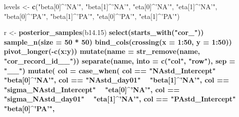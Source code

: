 \documentclass[]{article}
\newenvironment{Shaded}{\begin{snugshade}}{\end{snugshade}}
\newcommand{\DataTypeTok}[1]{\textcolor[rgb]{0.13,0.29,0.53}{#1}}
\newcommand{\DecValTok}[1]{\textcolor[rgb]{0.00,0.00,0.81}{#1}}
\newcommand{\FloatTok}[1]{\textcolor[rgb]{0.00,0.00,0.81}{#1}}
\newcommand{\KeywordTok}[1]{\textcolor[rgb]{0.13,0.29,0.53}{\textbf{#1}}}
\newcommand{\NormalTok}[1]{#1}
\newcommand{\OperatorTok}[1]{\textcolor[rgb]{0.81,0.36,0.00}{\textbf{#1}}}
\newcommand{\StringTok}[1]{\textcolor[rgb]{0.31,0.60,0.02}{#1}}
\begin{document}
\begin{Shaded}
\begin{Highlighting}[]
\NormalTok{levels <-}\StringTok{ }\KeywordTok{c}\NormalTok{(}\StringTok{"beta[0]^'NA'"}\NormalTok{, }\StringTok{"beta[1]^'NA'"}\NormalTok{, }\StringTok{"eta[0]^'NA'"}\NormalTok{, }\StringTok{"eta[1]^'NA'"}\NormalTok{,}
            \StringTok{"beta[0]^'PA'"}\NormalTok{, }\StringTok{"beta[1]^'PA'"}\NormalTok{, }\StringTok{"eta[0]^'PA'"}\NormalTok{, }\StringTok{"eta[1]^'PA'"}\NormalTok{)}

\NormalTok{r <-}
\StringTok{  }\KeywordTok{posterior_samples}\NormalTok{(b14}\FloatTok{.15}\NormalTok{) }\OperatorTok{%>%}\StringTok{ }
\StringTok{  }\KeywordTok{select}\NormalTok{(}\KeywordTok{starts_with}\NormalTok{(}\StringTok{"cor_"}\NormalTok{)) }\OperatorTok{%>%}\StringTok{ }
\StringTok{  }\KeywordTok{sample_n}\NormalTok{(}\DataTypeTok{size =} \DecValTok{50} \OperatorTok{*}\StringTok{ }\DecValTok{50}\NormalTok{) }\OperatorTok{%>%}\StringTok{ }
\StringTok{  }\KeywordTok{bind_cols}\NormalTok{(}\KeywordTok{crossing}\NormalTok{(}\DataTypeTok{x =} \DecValTok{1}\OperatorTok{:}\DecValTok{50}\NormalTok{, }\DataTypeTok{y =} \DecValTok{1}\OperatorTok{:}\DecValTok{50}\NormalTok{)) }\OperatorTok{%>%}\StringTok{ }
\StringTok{  }\KeywordTok{pivot_longer}\NormalTok{(}\OperatorTok{-}\KeywordTok{c}\NormalTok{(x}\OperatorTok{:}\NormalTok{y)) }\OperatorTok{%>%}\StringTok{ }
\StringTok{  }\KeywordTok{mutate}\NormalTok{(}\DataTypeTok{name =} \KeywordTok{str_remove}\NormalTok{(name, }\StringTok{"cor_record_id__"}\NormalTok{)) }\OperatorTok{%>%}\StringTok{ }
\StringTok{  }\KeywordTok{separate}\NormalTok{(name, }\DataTypeTok{into =} \KeywordTok{c}\NormalTok{(}\StringTok{"col"}\NormalTok{, }\StringTok{"row"}\NormalTok{), }\DataTypeTok{sep =} \StringTok{"__"}\NormalTok{) }\OperatorTok{%>%}\StringTok{ }
\StringTok{  }\KeywordTok{mutate}\NormalTok{(}
    \DataTypeTok{col =} \KeywordTok{case_when}\NormalTok{(}
\NormalTok{      col }\OperatorTok{==}\StringTok{ "NAstd_Intercept"}       \OperatorTok{~}\StringTok{ "beta[0]^'NA'"}\NormalTok{,}
\NormalTok{      col }\OperatorTok{==}\StringTok{ "NAstd_day01"}           \OperatorTok{~}\StringTok{ "beta[1]^'NA'"}\NormalTok{,}
\NormalTok{      col }\OperatorTok{==}\StringTok{ "sigma_NAstd_Intercept"} \OperatorTok{~}\StringTok{ "eta[0]^'NA'"}\NormalTok{,}
\NormalTok{      col }\OperatorTok{==}\StringTok{ "sigma_NAstd_day01"}     \OperatorTok{~}\StringTok{ "eta[1]^'NA'"}\NormalTok{,}
\NormalTok{      col }\OperatorTok{==}\StringTok{ "PAstd_Intercept"}       \OperatorTok{~}\StringTok{ "beta[0]^'PA'"}\NormalTok{,}
}}}}}}}
\end{Highlighting}
\end{Shaded}
\end{document}
